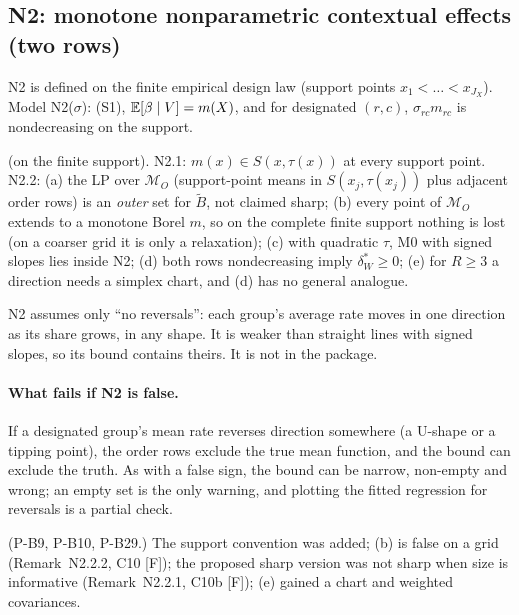 \subsection{N2: monotone nonparametric contextual effects (two rows)}

N2 is defined on the finite empirical design law (support points
$x_1<\dots<x_{J_X}$). Model N2($\sigma$): (S1), $\mathbb E[\beta\mid V]=m(X)$, and for
designated $(r,c)$, $\sigma_{rc}m_{rc}$ is nondecreasing on the support.

\begin{result}\label{res:n22}
 (on the finite support). N2.1: $m(x)\in S(x,\tau(x))$ at every
support point. N2.2: (a) the LP over $\mathcal M_O$ (support-point means in
$S(x_j,\tau(x_j))$ plus adjacent order rows) is an \emph{outer} set for $\tilde
B$, not claimed sharp; (b) every point of $\mathcal M_O$ extends to a monotone
Borel $m$, so on the complete finite support nothing is lost (on a coarser grid
it is only a relaxation); (c) with quadratic $\tau$, M0 with signed slopes lies
inside N2; (d) both rows nondecreasing imply $\delta^*_W\ge0$; (e) for $R\ge3$ a
direction needs a simplex chart, and (d) has no general analogue.
\end{result}
\begin{plain}
N2 assumes only ``no reversals'': each group's average rate moves in one
direction as its share grows, in any shape. It is weaker than straight lines with
signed slopes, so its bound contains theirs. It is not in the package.
\end{plain}
\paragraph{What fails if N2 is false.} If a designated group's mean rate reverses
direction somewhere (a U-shape or a tipping point), the order rows exclude the
true mean function, and the bound can exclude the truth. As with a false sign,
the bound can be narrow, non-empty and wrong; an empty set is the only warning,
and plotting the fitted regression for reversals is a partial check.

\begin{revnote}
(P-B9, P-B10, P-B29.) The support convention was added; (b) is false on a grid
(Remark~N2.2.2, C10 [F]); the proposed sharp version was not sharp when size is
informative (Remark~N2.2.1, C10b [F]); (e) gained a chart and weighted
covariances.
\end{revnote}

